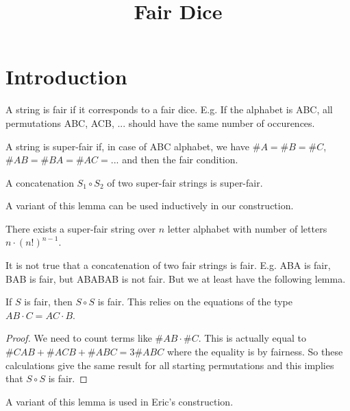 \documentclass{article}
\title{Fair Dice}
\begin{document}
\maketitle



\section{Introduction}

\begin{definition}
A string is fair if it corresponds to a fair dice. E.g. If the alphabet is ABC, all permutations ABC, ACB, ... should have the same number of occurences.   
\end{definition}

\begin{definition}
A string is super-fair if, in case of ABC alphabet, we have $\#A = \#B = \#C$, $\#AB = \#BA = \#AC = ...$ and then the fair condition.  
\end{definition}

\begin{lemma}
A concatenation $S_1 \circ S_2$ of two super-fair strings is super-fair.
\end{lemma}

A variant of this lemma can be used inductively in our construction. 

\begin{theorem}
There exists a super-fair string over $n$ letter alphabet with number of letters $n \cdot (n!)^{n-1}$. 
\end{theorem}

It is not true that a concatenation of two fair strings is fair. E.g. ABA is fair, BAB is fair, but ABABAB is not fair. But we at least have the following lemma.  

\begin{lemma}
If $S$ is fair, then $S\circ S$ is fair. This relies on the equations of the type $AB\cdot C = AC \cdot B$. 
\end{lemma}
\begin{proof}
We need to count terms like $\#AB \cdot \#C$. This is actually equal to $\#CAB + \#ACB + \#ABC = 3\#ABC$ where the equality is by fairness. So these calculations give the same result for all starting permutations and this implies that $S \circ S$ is fair. 
\end{proof}

A variant of this lemma is used in Eric's construction. 
\end{document}
